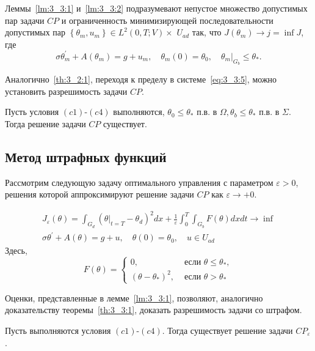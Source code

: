 Леммы~\ref{lm:3_3:1} и~\ref{lm:3_3:2} подразумевают
непустое множество допустимых пар задачи $CP$
и ограниченность минимизирующей последовательности допустимых пар
$\left\{\theta_{m}, u_{m}\right\} \in L^{2}(0, T ; V) \times$
$U_{a d}$ так, что $J\left(\theta_{m}\right) \rightarrow j=\inf J$, где
\begin{equation}
    \label{eq:3_3:5}
    \sigma \theta_{m}^{\prime}+A\left(\theta_{m}\right)=g+u_{m},
    \quad \theta_{m}(0)=\theta_{0},\left.\quad \theta_{m}\right|_{G_{b}} \leq \theta_{*}.
\end{equation}

Аналогично~\ref{th:3_2:1}, переходя к пределу в системе~\eqref{eq:3_3:5},
можно установить разрешимость задачи $CP$\@.

\begin{theorem}
    \label{th:3_3:1}
    Пусть условия $(c1)$-$(c4)$ выполняются,
    $\theta_{0} \leq \theta_{*}$ п.в. в $\Omega, \theta_{b} \leq \theta_{*}$ п.в. в $\Sigma$.
    Тогда решение задачи $CP$ существует.
\end{theorem}

\subsection{Метод штрафных функций}\label{subsec:ch3:sec3:subsec4}
Рассмотрим следующую задачу оптимального управления с параметром $\varepsilon>0$,
решения которой аппроксимируют решение задачи $CP$ как $\varepsilon \rightarrow+0$.
\begin{definition}
    \[
        \begin{gathered}
            J_{\varepsilon}(\theta)=\int_{G_{d}}
            \left(\left.\theta\right|_{t=T}
            -\theta_{d}\right)^{2} d x
            + \frac{1}{\varepsilon} \int_{0}^{T} \int_{G_{b}} F(\theta) d x d t \rightarrow \inf \\
            \sigma \theta^{\prime}+A(\theta)=g+u, \quad \theta(0)=\theta_{0}, \quad u \in U_{a d}
        \end{gathered}
    \]
    Здесь,
    \[
        F(\theta)=
        \begin{cases}
            0, & \text { если } \theta \leq \theta_{*}, \\
            \left(\theta-\theta_{*}\right)^{2}, & \text { если } \theta>\theta_{*}
        \end{cases}
    \]
\end{definition}
Оценки, представленные в лемме~\ref{lm:3_3:1}, позволяют, аналогично
доказательству теоремы~\ref{th:3_3:1}, доказать разрешимость задачи со штрафом.
\begin{theorem}
    \label{th:3_3:2}
    Пусть выполняются условия $(c1)$-$(c4)$.
    Тогда существует решение задачи $CP_{\varepsilon}$.
\end{theorem}

